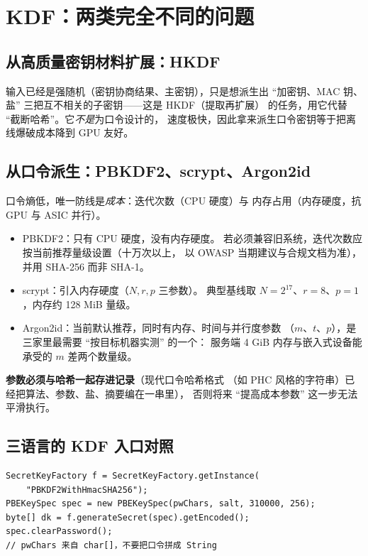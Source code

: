 \documentclass[12pt,a4paper,fontset=fandol]{ctexbook}
\begin{document}
\section{KDF：两类完全不同的问题}

\subsection{从高质量密钥材料扩展：HKDF}

输入已经是强随机（密钥协商结果、主密钥），只是想派生出
``加密钥、MAC 钥、盐'' 三把互不相关的子密钥——这是 HKDF（提取再扩展）
的任务，用它代替 ``截断哈希''。它\emph{不是}为口令设计的，
速度极快，因此拿来派生口令密钥等于把离线爆破成本降到 GPU 友好。

\subsection{从口令派生：PBKDF2、scrypt、Argon2id}

口令熵低，唯一防线是\emph{成本}：迭代次数（CPU 硬度）与
内存占用（内存硬度，抗 GPU 与 ASIC 并行）。

\begin{itemize}
  \item PBKDF2：只有 CPU 硬度，没有内存硬度。
        若必须兼容旧系统，迭代次数应按当前推荐量级设置（十万次以上，
        以 OWASP 当期建议与合规文档为准），并用 SHA-256 而非 SHA-1。
  \item scrypt：引入内存硬度（$N,r,p$ 三参数）。
        典型基线取 $N=2^{17}$、$r=8$、$p=1$，内存约 128 MiB 量级。
  \item Argon2id：当前默认推荐，同时有内存、时间与并行度参数
        （$m$、$t$、$p$），是三家里最需要 ``按目标机器实测'' 的一个：
        服务端 4 GiB 内存与嵌入式设备能承受的 $m$ 差两个数量级。
\end{itemize}

\textbf{参数必须与哈希一起存进记录}（现代口令哈希格式
（如 PHC 风格的字符串）已经把算法、参数、盐、摘要编在一串里），
否则将来 ``提高成本参数'' 这一步无法平滑执行。

\subsection{三语言的 KDF 入口对照}

\begin{lstlisting}[style=javastyle,caption={Java：PBKDF2WithHmacSHA256}]
SecretKeyFactory f = SecretKeyFactory.getInstance(
    "PBKDF2WithHmacSHA256");
PBEKeySpec spec = new PBEKeySpec(pwChars, salt, 310000, 256);
byte[] dk = f.generateSecret(spec).getEncoded();
spec.clearPassword();
// pwChars 来自 char[]，不要把口令拼成 String
\end{lstlisting}
\end{document}
